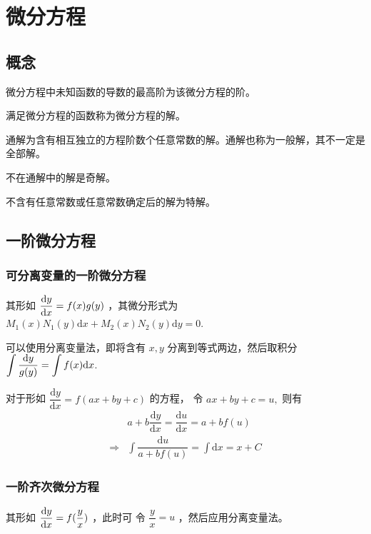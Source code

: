 \chapter{微分方程}

\section{概念}

微分方程中未知函数的导数的最高阶为该微分方程的阶。

满足微分方程的函数称为微分方程的解。

通解为含有相互独立的方程阶数个任意常数的解。通解也称为一般解，其不一定是全部解。

不在通解中的解是奇解。

不含有任意常数或任意常数确定后的解为特解。

\section{一阶微分方程}

\subsection{可分离变量的一阶微分方程}

其形如 $ \displaystyle \dfrac{\mathrm{d} y}{\mathrm{d}x} = f(x)g(y) $ ，其微分形式为
$ M_1(x)N_1(y)\mathrm{d}x+M_2(x)N_2(y)\mathrm{d}y = 0 $.

可以使用分离变量法，即将含有 $ x,y $ 分离到等式两边，然后取积分 
$ \displaystyle \int \dfrac{\mathrm{d}y}{g(y)} = \int f(x)\mathrm{d}x $.

对于形如 $ \dfrac{\mathrm{d}y}{\mathrm{d}x} = f(ax+by+c) $ 的方程，
令 $ ax+by+c = u, $ 则有 
\begin{equation*}
    \begin{aligned}
        &a+b\dfrac{\mathrm{d}y}{\mathrm{d}x} = \dfrac{\mathrm{d}u}{\mathrm{d}x} = a+bf(u) \\ 
        \Rightarrow &\int \dfrac{\mathrm{d}u}{a+bf(u)} = \int \mathrm{d}x = x+C
    \end{aligned}
\end{equation*}

\subsection{一阶齐次微分方程}

其形如 $ \displaystyle \dfrac{\mathrm{d}y}{\mathrm{d}x}=f(\dfrac{y}{x}) $ ，此时可
令 $ \dfrac{y}{x} = u $ ，然后应用分离变量法。

